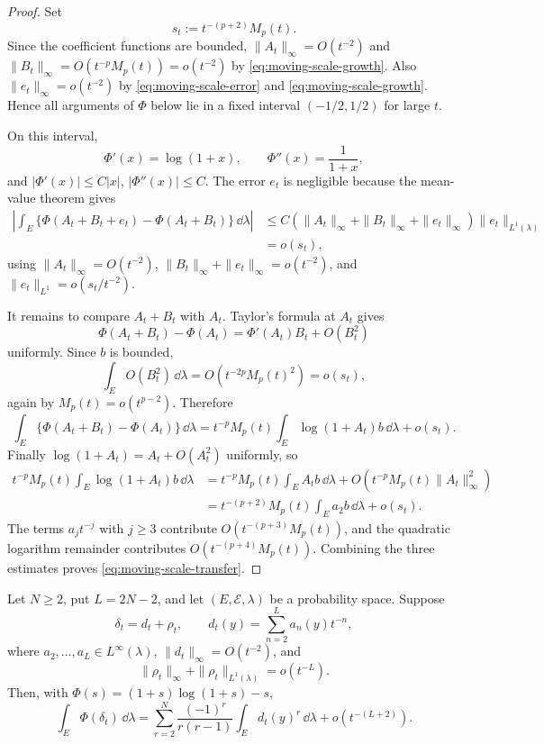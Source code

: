 \begin{proof}
Set
\[
  s_t:=t^{-(p+2)}M_p(t).
\]
Since the coefficient functions are bounded,
\(\|A_t\|_\infty=O(t^{-2})\) and
\(\|B_t\|_\infty=O(t^{-p}M_p(t))=o(t^{-2})\) by
\eqref{eq:moving-scale-growth}.  Also
\(\|e_t\|_\infty=o(t^{-2})\) by
\eqref{eq:moving-scale-error} and \eqref{eq:moving-scale-growth}.  Hence all
arguments of \(\Phi\) below lie in a fixed interval \((-1/2,1/2)\) for large
\(t\).

On this interval,
\[
  \Phi'(x)=\log(1+x),\qquad \Phi''(x)=\frac1{1+x},
\]
and \(|\Phi'(x)|\le C|x|\), \(|\Phi''(x)|\le C\).  The error \(e_t\) is
negligible because the mean-value theorem gives
\[
\begin{aligned}
\left|\int_E\{\Phi(A_t+B_t+e_t)-\Phi(A_t+B_t)\}\,\dd\lambda\right|
&\le
C(\|A_t\|_\infty+\|B_t\|_\infty+\|e_t\|_\infty)\|e_t\|_{L^1(\lambda)}\\
&=o(s_t),
\end{aligned}
\]
using \(\|A_t\|_\infty=O(t^{-2})\),
\(\|B_t\|_\infty+\|e_t\|_\infty=o(t^{-2})\), and
\(\|e_t\|_{L^1}=o(s_t/t^{-2})\).

It remains to compare \(A_t+B_t\) with \(A_t\).  Taylor's formula at \(A_t\)
gives
\[
\Phi(A_t+B_t)-\Phi(A_t)
=\Phi'(A_t)B_t+O(B_t^2)
\]
uniformly.  Since \(b\) is bounded,
\[
  \int_E O(B_t^2)\,\dd\lambda
  =O(t^{-2p}M_p(t)^2)
  =o(s_t),
\]
again by \(M_p(t)=o(t^{p-2})\).  Therefore
\[
  \int_E\{\Phi(A_t+B_t)-\Phi(A_t)\}\,\dd\lambda
  =
  t^{-p}M_p(t)\int_E\log(1+A_t)b\,\dd\lambda+o(s_t).
\]
Finally \(\log(1+A_t)=A_t+O(A_t^2)\) uniformly, so
\[
\begin{aligned}
t^{-p}M_p(t)\int_E\log(1+A_t)b\,\dd\lambda
&=
t^{-p}M_p(t)\int_EA_tb\,\dd\lambda+O(t^{-p}M_p(t)\|A_t\|_\infty^2)\\
&=
t^{-(p+2)}M_p(t)\int_Ea_2b\,\dd\lambda+o(s_t).
\end{aligned}
\]
The terms \(a_jt^{-j}\) with \(j\ge3\) contribute \(O(t^{-(p+3)}M_p(t))\),
and the quadratic logarithm remainder contributes \(O(t^{-(p+4)}M_p(t))\).
Combining the three estimates proves \eqref{eq:moving-scale-transfer}.
\end{proof}

\begin{proposition}%
\label{prop:finite-density-jet-entropy-transfer}
Let \(N\ge2\), put \(L=2N-2\), and let \((E,\mathcal E,\lambda)\) be a
probability space.  Suppose
\[
\delta_t=d_t+\rho_t,\qquad
d_t(y)=\sum_{n=2}^{L}a_n(y)t^{-n},
\]
where \(a_2,\ldots,a_L\in L^\infty(\lambda)\),
\(\|d_t\|_\infty=O(t^{-2})\), and
\[
\|\rho_t\|_\infty+\|\rho_t\|_{L^1(\lambda)}=o(t^{-L}).
\]
Then, with \(\Phi(s)=(1+s)\log(1+s)-s\),
\[
\int_E\Phi(\delta_t)\,\dd\lambda
=
\sum_{r=2}^{N}\frac{(-1)^r}{r(r-1)}
\int_E d_t(y)^r\,\dd\lambda
+o(t^{-(L+2)}).
\]
\end{proposition}


